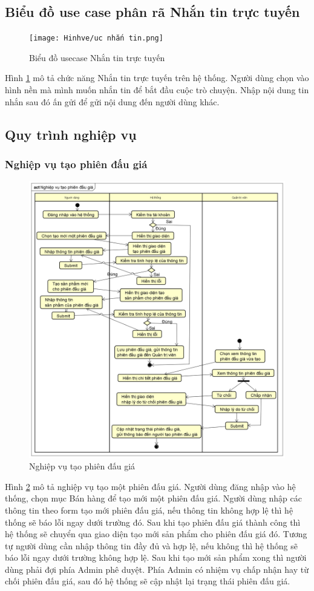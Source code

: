 \documentclass[../DoAn.tex]{subfiles}
\begin{document}
\subsection{Biểu đồ use case phân rã Nhắn tin trực tuyến}
\label{subsection:2.2.6}
\begin{figure}[H]
    \centering
    \texttt{[image: Hinhve/uc nhắn tin.png]}
    \caption{Biểu đồ usecase Nhắn tin trực tuyến}
    \label{fig:Fig26}
\end{figure}
Hình \ref{fig:Fig26} mô tả chức năng Nhắn tin trực tuyến trên hệ thống. Người dùng chọn vào hình nền mà mình muốn nhắn tin để bắt đầu cuộc trò chuyện. Nhập nội dung tin nhắn sau đó ấn gửi để gửi nội dung đến người dùng khác. 
\subsection{Quy trình nghiệp vụ}
\label{subsection:2.2.7}
\subsubsection{Nghiệp vụ tạo phiên đấu giá}
\label{subsubsection:2.2.7.1}
\begin{figure}[H]
    \centering
    \includegraphics[width=0.75\linewidth,height=12.1cm]{Hinhve/tao_phien_dau_gia.png}
    \caption{Nghiệp vụ tạo phiên đấu giá}
    \label{fig:Fig27}
\end{figure}
Hình \ref{fig:Fig27} mô tả nghiệp vụ tạo một phiên đấu giá. Người dùng đăng nhập vào hệ thống, chọn mục Bán hàng để tạo mới một phiên đấu giá. Người dùng nhập các thông tin theo form tạo mới phiên đấu giá, nếu thông tin không hợp lệ thì hệ thống sẽ báo lỗi ngay dưới trường đó. Sau khi tạo phiên đấu giá thành công thì hệ thống sẽ chuyển qua giao diện tạo mới sản phẩm cho phiên đấu giá đó. Tương tự người dùng cần nhập thông tin đầy đủ và hợp lệ, nếu không thì hệ thống sẽ báo lỗi ngay dưới trường không hợp lệ. Sau khi tạo mới sản phẩm xong thì người dùng phải đợi phía Admin phê duyệt. Phía Admin có nhiệm vụ chấp nhận hay từ chối phiên đấu giá, sau đó hệ thống sẽ cập nhật lại trạng thái phiên đấu giá.
\newpage
\end{document}
